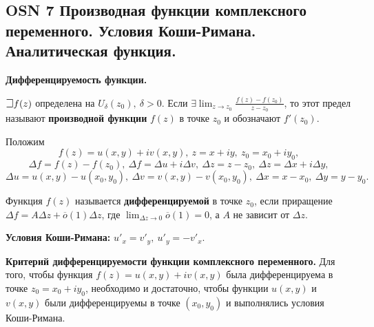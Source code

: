 \subsection{OSN 7 Производная функции комплексного переменного. Условия Коши-Римана. Аналитическая  функция.}

\textbf{Дифференцируемость функции.}

$\mathLet f(z)$ определена на $U_{\delta}(z_0),~\delta > 0$. Если $\exists \displaystyle\lim_{z\to z_0} \frac{f(z) - f(z_0)}{z - z_0}$,
то этот предел называют \textbf{производной функции} $f(z)$ в точке $z_0$ и обозначают $f'(z_0)$.

Положим $$f(z) = u(x, y) + iv(x, y),~z = x + iy,~z_0 = x_0 + iy_0,$$
$$\Delta f = f(z)-f(z_0),~\Delta f = \Delta u + i\Delta v,~\Delta z = z- z_0,~\Delta z = \Delta x + i\Delta y,$$
$$\Delta u = u(x, y)-u(x_0, y_0),~\Delta v = v(x, y)-v(x_0, y_0),~\Delta x = x-x_0,~\Delta y = y- y_0.$$

Функция $f(z)$ называется \textbf{дифференцируемой} в точке $z_0$, если приращение $\Delta f = A\Delta z + \overline{o}(1)\Delta z$, где $\displaystyle\lim_{\Delta z\to0} \overline{o}(1) = 0$, а $A$ не зависит от $\Delta z$.

\textbf{Условия Коши-Римана:}
$u'_x = v'_y,~u'_y = -v'_x.$

\textbf{Критерий дифференцируемости функции комплексного переменного.}
Для того, чтобы функция $f(z) = u(x,y)+iv(x,y)$ была дифференцируема в точке $z_0 =x_0+iy_0$, необходимо и достаточно, чтобы функции $u(x,y)$ и $v(x,y)$ были дифференцируемы в точке $(x_0, y_0)$ и выполнялись условия Коши-Римана.

